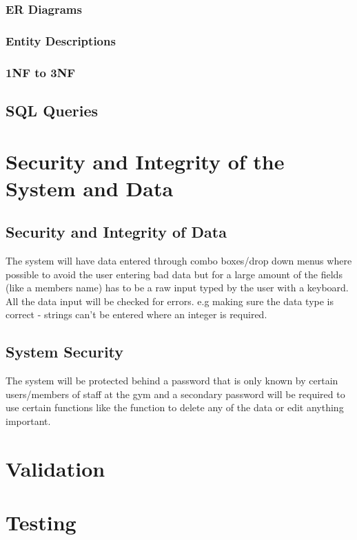 \begin{itemize}
\subsubsection{ER Diagrams}

\subsubsection{Entity Descriptions}

\subsubsection{1NF to 3NF}

\subsection{SQL Queries}

\section{Security and Integrity of the System and Data}

\subsection{Security and Integrity of Data}
The system will have data entered through combo boxes/drop down menus where possible to avoid the user entering bad data but for a large amount of the fields (like a members name) has to be a raw input typed by the user with a keyboard. All the data input will be checked for errors. e.g making sure the data type is correct - strings can't be entered where an integer is required. 

\subsection{System Security}
The system will be protected behind a password that is only known by certain users/members of staff at the gym and a secondary password will be required to use certain functions like the function to delete any of the data or edit anything important.

\section{Validation}

\section{Testing}


\end{itemize}
